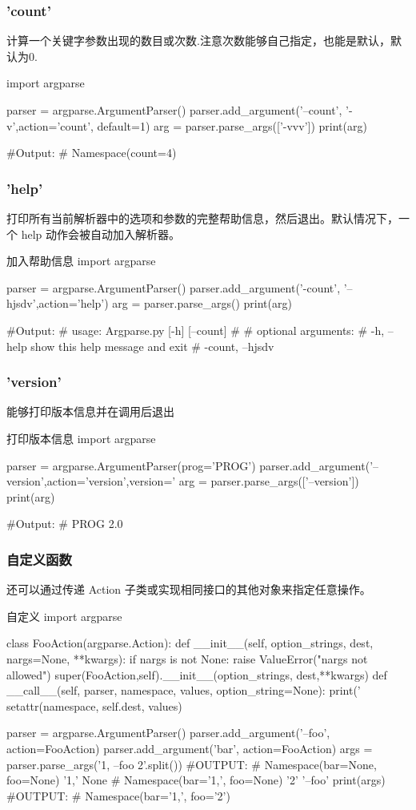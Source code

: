\documentclass[11pt]{article}
\begin{document}
\subsubsection{'count'}
计算一个关键字参数出现的数目或次数.注意次数能够自己指定，也能是默认，默认为0.
\begin{Python}
import argparse

parser = argparse.ArgumentParser()
parser.add_argument('--count', '-v',action='count', default=1)
arg = parser.parse_args(['-vvv'])
print(arg)

#Output:
#       Namespace(count=4)
\end{Python}
\subsubsection{'help'}
打印所有当前解析器中的选项和参数的完整帮助信息，然后退出。默认情况下，一个 help 动作会被自动加入解析器。
\begin{Python}{加入帮助信息}
import argparse

parser = argparse.ArgumentParser()
parser.add_argument('-count', '--hjsdv',action='help')
arg = parser.parse_args()
print(arg)

#Output:
#       usage: Argparse.py [-h] [--count]
#
#       optional arguments:
#           -h, --help       show this help message and exit
#           -count, --hjsdv
\end{Python}
\subsubsection{'version'}
能够打印版本信息并在调用后退出
\begin{Python}{打印版本信息}
import argparse

parser = argparse.ArgumentParser(prog='PROG')
parser.add_argument('--version',action='version',version='%
arg = parser.parse_args(['--version'])
print(arg)

#Output:
#       PROG 2.0
\end{Python}
\subsubsection{自定义函数}
还可以通过传递 Action 子类或实现相同接口的其他对象来指定任意操作。
\begin{Python}{自定义}
import argparse

class FooAction(argparse.Action):
def __init__(self, option_strings, dest, nargs=None, **kwargs):
if nargs is not None:
raise ValueError("nargs not allowed")
super(FooAction,self).__init__(option_strings, dest,**kwargs)
def __call__(self, parser, namespace, values, option_string=None):
print(' %
setattr(namespace, self.dest, values)

parser = argparse.ArgumentParser()
parser.add_argument('--foo', action=FooAction)
parser.add_argument('bar', action=FooAction)
args = parser.parse_args('1, --foo 2'.split())
#OUTPUT:
#        Namespace(bar=None, foo=None) '1,' None
#        Namespace(bar='1,', foo=None) '2' '--foo'
print(args)
#OUTPUT:
#        Namespace(bar='1,', foo='2')
\end{Python}
\end{document}
